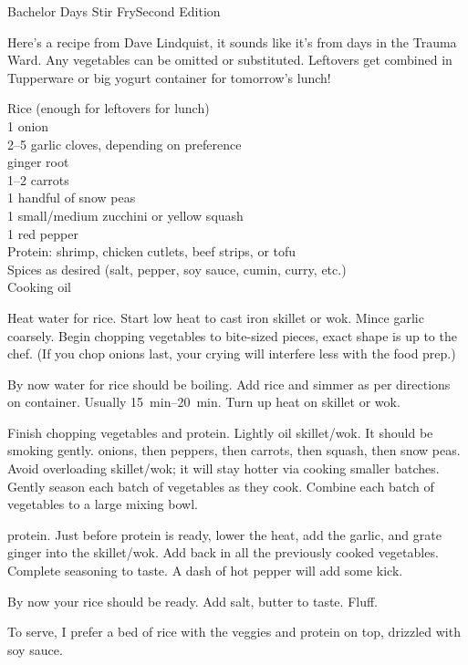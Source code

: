 \begin{entry}{Bachelor Days Stir Fry}{Second Edition}

\begin{open}
  Here's a recipe from Dave Lindquist, it sounds like it's from days in the
  Trauma Ward. Any vegetables can be omitted or substituted. Leftovers get
  combined in Tupperware or big yogurt container for tomorrow's lunch!
\end{open}
\begin{ingredients}
    Rice (enough for leftovers for lunch)\\
    1 onion\\
    \numrange{2}{5} garlic cloves, depending on preference\\
    ginger root\\
    \numrange{1}{2} carrots\\
    1 handful of snow peas\\
    1 small/medium zucchini or yellow squash\\
    1 red pepper\\
    Protein: shrimp, chicken cutlets, beef strips, or tofu\\
    Spices as desired (salt, pepper, soy sauce, cumin, curry, etc.)\\
    Cooking oil
\end{ingredients}
Heat water for rice. Start low heat to cast iron skillet or wok. Mince garlic
coarsely. Begin chopping vegetables to bite-sized pieces, exact shape is up to
the chef. (If you chop onions last, your crying will interfere less with the
food prep.)

By now water for rice should be boiling. Add rice and simmer as per directions
on container. Usually \SIrange{15}{20}{\minute}. Turn up heat on skillet or
wok.

Finish chopping vegetables and protein. Lightly oil skillet/wok. It should be
smoking gently. \Saute onions, then peppers, then carrots, then squash, then
snow peas. Avoid overloading skillet/wok; it will stay hotter via cooking
smaller batches. Gently season each batch of vegetables as they cook. Combine
each batch of \sauteed vegetables to a large mixing bowl.

\Saute protein. Just before protein is ready, lower the heat, add the garlic,
and grate ginger into the skillet/wok. Add back in all the previously cooked
vegetables. Complete seasoning to taste. A dash of hot pepper will add some
kick.

By now your rice should be ready. Add salt, butter to taste. Fluff.

To serve, I prefer a bed of rice with the veggies and protein on top, drizzled
with soy sauce.
\end{entry}

